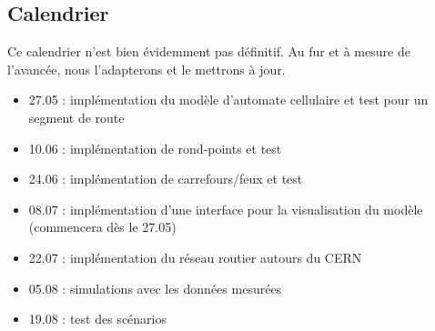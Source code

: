 \documentclass[a4paper,10pt]{extarticle}
\begin{document}
\subsection*{Calendrier}

Ce calendrier n'est bien évidemment pas définitif. Au fur et à mesure de l'avancée, nous l'adapterons et le mettrons à jour.

\begin{itemize}
\item 27.05 : implémentation du modèle d'automate cellulaire et test pour un segment de route
\item 10.06 : implémentation de rond-points et test
\item 24.06 : implémentation de carrefours/feux et test
\item 08.07 : implémentation d'une interface pour la visualisation du modèle (commencera dès le 27.05)
\item 22.07 : implémentation du réseau routier autours du CERN
\item 05.08 : simulations avec les données mesurées
\item 19.08 : test des scénarios
\end{itemize}
\end{document}
